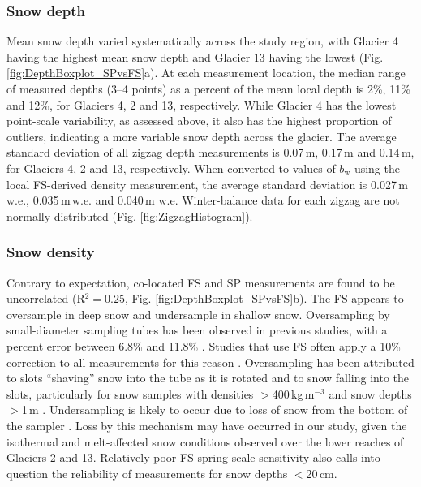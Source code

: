 \documentclass[twocolumn, letterpaper]{igs}
\begin{document}
\subsubsection{Snow depth}
Mean snow depth varied systematically across the study region, with Glacier 4 having the highest mean snow depth and Glacier 13 having the lowest (Fig. \ref{fig:DepthBoxplot_SPvsFS}a). At each measurement location, the median range of measured depths (3--4 points) as a percent of the mean local depth is 2\%, 11\% and 12\%, for Glaciers 4, 2 and 13, respectively. While Glacier 4 has the lowest point-scale variability, as assessed above, it also has the highest proportion of outliers, indicating a more variable snow depth across the glacier. The average standard deviation of all zigzag depth measurements is 0.07\,m, 0.17\,m and 0.14\,m, for Glaciers 4, 2 and 13, respectively. When converted to values of $b_\mathrm{w}$ using the local FS-derived density measurement, the average standard deviation is 0.027\,m\,w.e., 0.035\,m\,w.e. and 0.040\,m w.e. Winter-balance data for each zigzag are not normally distributed (Fig. \ref{fig:ZigzagHistogram}).

\subsubsection{Snow density}

Contrary to expectation, co-located FS and SP measurements are found to be uncorrelated (R$^2=0.25$, Fig. \ref{fig:DepthBoxplot_SPvsFS}b). The FS appears to oversample in deep snow and undersample in shallow snow. Oversampling by small-diameter sampling tubes has been observed in previous studies, with a percent error between 6.8\% and 11.8\% \citep[e.g.][]{Work1965, Fames1982, Conger2009}. Studies that use FS often apply a 10\% correction to all measurements for this reason \citep[e.g.][]{Molotch2005}. Oversampling has been attributed to slots ``shaving'' snow into the tube as it is rotated \citep[e.g.][]{Dixon2012} and to snow falling into the slots, particularly for snow samples with densities $>$400\,kg\,m$^{-3}$ and snow depths $>$1\,m \citep[e.g.][]{Beaumont1963}. Undersampling is likely to occur due to loss of snow from the bottom of the sampler \citep{Turcan1975}. Loss by this mechanism may have occurred in our study, given the isothermal and melt-affected snow conditions observed over the lower reaches of Glaciers 2 and 13. Relatively poor FS spring-scale sensitivity also calls into question the reliability of measurements for snow depths $<$20\,cm.
\end{document}
